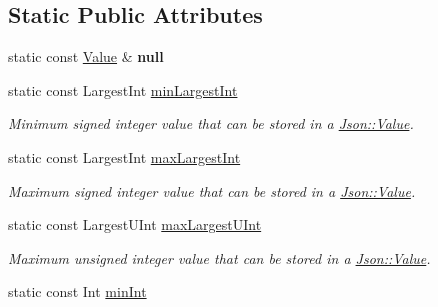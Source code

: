 \subsection*{Static Public Attributes}
\begin{DoxyCompactItemize}
\item 
\mbox{\label{class_json_1_1_value_a0f2ea8f6338ab3de443b83108d6756f6}} 
static const \mbox{\hyperlink{class_json_1_1_value}{Value}} \& {\bfseries null}
\item 
\mbox{\label{class_json_1_1_value_af91df130daa50dd43d2cd89e6ee67706}} 
static const Largest\+Int \mbox{\hyperlink{class_json_1_1_value_af91df130daa50dd43d2cd89e6ee67706}{min\+Largest\+Int}}
\begin{DoxyCompactList}\small\item\em Minimum signed integer value that can be stored in a \mbox{\hyperlink{class_json_1_1_value}{Json\+::\+Value}}. \end{DoxyCompactList}\item 
\mbox{\label{class_json_1_1_value_a8b4977696f13296fa8755c7953fafb2f}} 
static const Largest\+Int \mbox{\hyperlink{class_json_1_1_value_a8b4977696f13296fa8755c7953fafb2f}{max\+Largest\+Int}}
\begin{DoxyCompactList}\small\item\em Maximum signed integer value that can be stored in a \mbox{\hyperlink{class_json_1_1_value}{Json\+::\+Value}}. \end{DoxyCompactList}\item 
\mbox{\label{class_json_1_1_value_a8ddb32d9d55fa5323ae5135639dc2e31}} 
static const Largest\+U\+Int \mbox{\hyperlink{class_json_1_1_value_a8ddb32d9d55fa5323ae5135639dc2e31}{max\+Largest\+U\+Int}}
\begin{DoxyCompactList}\small\item\em Maximum unsigned integer value that can be stored in a \mbox{\hyperlink{class_json_1_1_value}{Json\+::\+Value}}. \end{DoxyCompactList}\item 
\mbox{\label{class_json_1_1_value_a7df8a39e2502b8c92a6a41e3d752d2c8}} 
static const Int \mbox{\hyperlink{class_json_1_1_value_a7df8a39e2502b8c92a6a41e3d752d2c8}{min\+Int}}

\end{DoxyCompactItemize}
